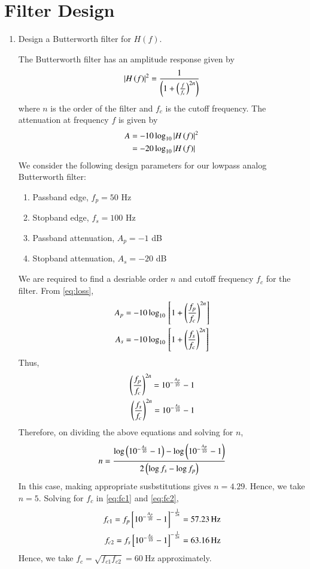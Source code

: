 \documentclass[journal,12pt,twocolumn]{IEEEtran}
\renewcommand\thesection{\arabic{section}}
\begin{document}
\section{Filter Design}
\begin{enumerate}[label=\thesection.\arabic*
,ref=\thesection.\theenumi]
\item Design a Butterworth filter for $H(f)$.

\solution The Butterworth filter has an amplitude response
given by
\begin{align}
    \abs{H\brak{f}}^2 = \frac{1}{\brak{1 + \brak{\frac{f}{f_c}}^{2n}}}
\end{align}
where $n$ is the order of the filter and $f_c$ is the cutoff
frequency. The attenuation at frequency $f$ is given by 
\begin{align}
    A &= -10\log_{10}\abs{H\brak{f}}^2 \\
      &= -20\log_{10}\abs{H\brak{f}}
    \label{eq:loss}
\end{align}
We consider the following design parameters for our
lowpass analog Butterworth filter:
\begin{enumerate}
    \item Passband edge, $f_p = 50$ Hz
    \item Stopband edge, $f_s = 100$ Hz
    \item Passband attenuation, $A_p = -1$ dB
    \item Stopband attenuation, $A_s = -20$ dB
\end{enumerate}
We are required to find a desriable order $n$ and cutoff
frequency $f_c$ for the filter. From \eqref{eq:loss},
\begin{align}
    A_p &= -10\log_{10}\sbrak{1 + \brak{\frac{f_p}{f_c}}^{2n}} \\
    A_s &= -10\log_{10}\sbrak{1 + \brak{\frac{f_s}{f_c}}^{2n}}
\end{align}
Thus,
\begin{align}
    \brak{\frac{f_p}{f_c}}^{2n} = 10^{-\frac{A_p}{10}} - 1 \label{eq:fc1} \\
    \brak{\frac{f_s}{f_c}}^{2n} = 10^{-\frac{A_s}{10}} - 1 \label{eq:fc2}
\end{align}
Therefore, on dividing the above equations and solving for $n$,
\begin{align}
    n = \frac{\log\brak{10^{-\frac{A_s}{10}} - 1} - 
    \log\brak{10^{-\frac{A_p}{10}} - 1}}{2\brak{\log{f_s} - \log{f_p}}}
\end{align}
In this case, making appropriate susbstitutions gives $n = 4.29$.
Hence, we take $n = 5$. Solving for $f_c$ in \eqref{eq:fc1} and
\eqref{eq:fc2},
\begin{align}
    f_{c1} = f_p\sbrak{10^{-\frac{A_p}{10}} - 1}^{-\frac{1}{2n}} = \SI[parse-numbers=false]{57.23}{\hertz} \\
    f_{c2} = f_s\sbrak{10^{-\frac{A_s}{10}} - 1}^{-\frac{1}{2n}} = \SI[parse-numbers=false]{63.16}{\hertz}
\end{align}
Hence, we take $f_c = \sqrt{f_{c1}f_{c2}} = \SI[parse-numbers=false]{60}{\hertz}$ approximately.


\end{enumerate}
\end{document}
